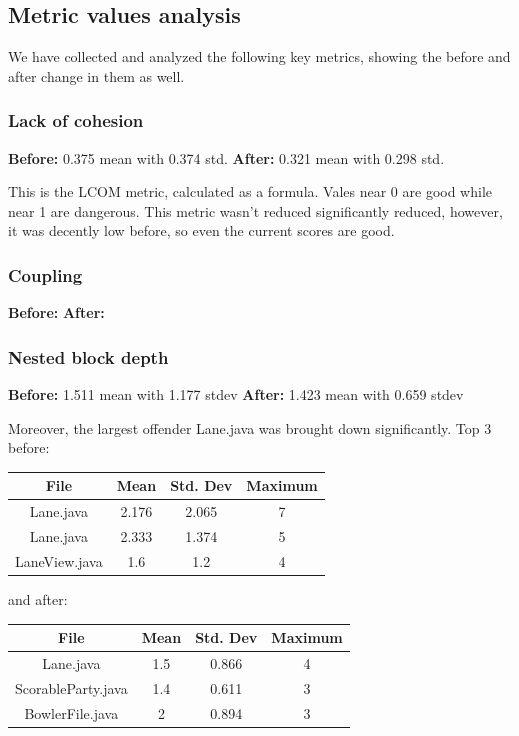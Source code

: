 \subsection{Metric values analysis}

We have collected and analyzed the following key metrics, showing the before and after change in them as well.

\subsubsection{Lack of cohesion}

\textbf{Before:} 0.375 mean with 0.374 std.
\textbf{After:} 0.321 mean with 0.298 std.

This is the LCOM metric, calculated as a formula. Vales near 0 are good while near 1 are dangerous. This metric wasn't reduced significantly reduced, however, it was decently low before, so even the current scores are good.

\subsubsection{Coupling}
\textbf{Before:}
\textbf{After:}

\subsubsection{Nested block depth}
\textbf{Before:} 1.511 mean with 1.177 stdev
\textbf{After:} 1.423 mean with 0.659 stdev

Moreover, the largest offender Lane.java was brought down significantly. Top 3 before:

\begin{tabular}{ |c|c|c|c| }
    \hline
    \textbf{File}       & \textbf{Mean} & \textbf{Std. Dev} & \textbf{Maximum} \\
    \hline
    Lane.java & 2.176          & 2.065             & 7                \\
    Lane.java           & 2.333         & 1.374             & 5                \\
    LaneView.java       & 1.6             & 1.2             & 4                \\
    \hline
\end{tabular}

and after:

\begin{tabular}{ |c|c|c|c| }
    \hline
    \textbf{File}       & \textbf{Mean} & \textbf{Std. Dev} & \textbf{Maximum} \\
    \hline
    Lane.java           & 1.5           & 0.866             & 4                \\
    ScorableParty.java           & 1.4           & 0.611             & 3                \\
    BowlerFile.java       & 2             & 0.894             & 3                \\
    \hline
\end{tabular}

